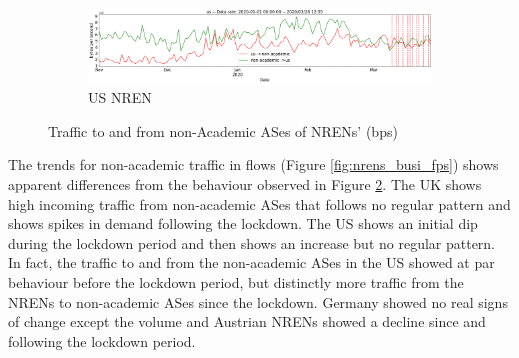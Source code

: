 \documentclass[10pt, journal, letterpaper]{IEEEtran}
\newcommand\linearFigSze{0.48}
\begin{document}
\begin{figure}
    \begin{subfigure}{\linearFigSze\textwidth}
          \centering
          \includegraphics[width=\columnwidth]{img/us_busi_bps.png}
          \caption{US NREN}
          \label{fig:US_busi_bps}
    \end{subfigure}
    \caption{Traffic to and from non-Academic ASes of NRENs' (bps)}
    \label{fig:nrens_busi_bps}
\end{figure}

The trends for non-academic traffic in flows (Figure \ref{fig:nrens_busi_fps}) shows apparent differences from the behaviour observed in Figure \ref{fig:nrens_busi_bps}. The UK shows high incoming traffic from non-academic ASes that follows no regular pattern and shows spikes in demand following the lockdown. The US shows an initial dip during the lockdown period and then shows an increase but no regular pattern. In fact, the traffic to and from the non-academic ASes in the US showed at par behaviour before the lockdown period, but distinctly more traffic from the NRENs to non-academic ASes since the lockdown. Germany showed no real signs of change except the volume and Austrian NRENs showed a decline since and following the lockdown period.
\end{document}
